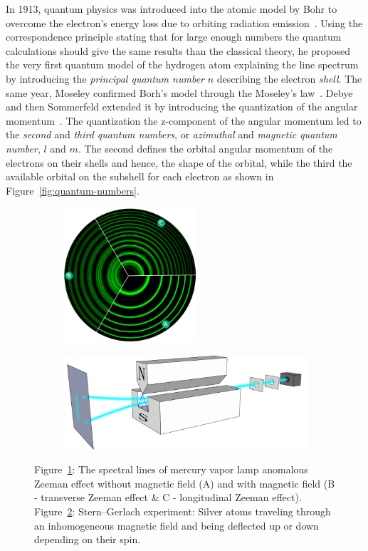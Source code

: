 	In 1913, quantum physics was introduced into the atomic model by Bohr to overcome the electron's energy loss due to orbiting radiation emission~\cite{BOHR1913}. Using the correspondence principle stating that for large enough numbers the quantum calculations should give the same results than the classical theory, he proposed the very first quantum model of the hydrogen atom explaining the line spectrum by introducing the \textit{principal quantum number} $n$ describing the electron \textit{shell}. The same year, Moseley confirmed Borh's model through the Moseley's law~\cite{MOSELEY1913}. Debye and then Sommerfeld extended it by introducing the quantization of the angular momentum~\cite{SOMMERFELD1916}. The quantization the z-component of the angular momentum led to the \textit{second} and \textit{third quantum numbers}, or \textit{azimuthal} and \textit{magnetic quantum number}, $l$ and $m$. The second defines the orbital angular momentum of the electrons on their shells and hence, the shape of the orbital, while the third the available orbital on the subshell for each electron as shown in Figure~\ref{fig:quantum-numbers}.
	
	\begin{figure}[H]
		\begin{subfigure}{\linewidth}
			\centering
			\includegraphics[height=5cm]{fig/chapt2/ZeemanEffectIllus.png}
			\caption{\label{fig:spin:A}}
		\end{subfigure}
		\begin{subfigure}{\linewidth}
			\centering
			\includegraphics[width = \plotwidth]{fig/chapt2/Stern-Gerlach_experiment.pdf}
			\caption{\label{fig:spin:B}}
		\end{subfigure}
		\caption{\label{fig:spin} Figure~\ref{fig:spin:A}: The spectral lines of mercury vapor lamp anomalous Zeeman effect without magnetic field (A) and with magnetic field (B - transverse Zeeman effect \& C - longitudinal Zeeman effect). Figure~\ref{fig:spin:B}: Stern–Gerlach experiment: Silver atoms traveling through an inhomogeneous magnetic field and being deflected up or down depending on their spin.}
	\end{figure}
	
